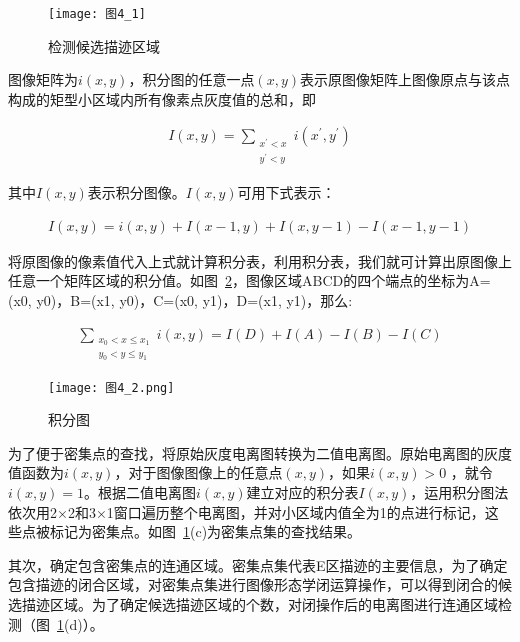 \begin{figure}[!ht]
\centering
\texttt{[image: 图4\_1]}
\caption{检测候选描迹区域}
\label{图4_1}
\end{figure} 

图像矩阵为$i(x,y)$，积分图的任意一点$(x,y)$表示原图像矩阵上图像原点与该点构成的矩型小区域内所有像素点灰度值的总和，即
\begin{linenomath}
\begin{align}
I(x,y)=\sum_{\substack{x^{'}<x\\y^{'}<y}}i(x^{'},y^{'})
\label{式4_1}
\end{align}
\end{linenomath}

其中$I(x,y)$表示积分图像。$I(x,y)$可用下式表示：
\begin{linenomath}
\begin{align}
I(x,y)=i(x,y)+I(x-1,y)+I(x,y-1)-I(x-1,y-1)
\label{式4_2}
\end{align}
\end{linenomath}

          
将原图像的像素值代入上式就计算积分表，利用积分表，我们就可计算出原图像上任意一个矩阵区域的积分值。如图~\ref{图4_2}，图像区域ABCD的四个端点的坐标为A=(x0, y0)，B=(x1, y0)，C=(x0, y1)，D=(x1, y1)，那么:
\begin{linenomath}
\begin{align}
\sum_{\substack{x_{0}<x\le x_{1} \\y_{0}<y\le y_{1}}}i(x,y)=I(D)+I(A)-I(B)-I(C)
\label{式4_3}
\end{align}
\end{linenomath}

\begin{figure}[!ht]
\centering
\texttt{[image: 图4\_2.png]}
\caption{积分图}
\label{图4_2}
\end{figure} 
	        
  
为了便于密集点的查找，将原始灰度电离图转换为二值电离图。原始电离图的灰度值函数为$i(x,y)$，对于图像图像上的任意点$(x,y)$，如果$i(x,y)>0$ ，就令$i(x,y)=1$。根据二值电离图$i(x,y)$建立对应的积分表$I(x,y)$，运用积分图法依次用2×2和3×1窗口遍历整个电离图，并对小区域内值全为1的点进行标记，这些点被标记为密集点。如图~\ref{图4_1}(c)为密集点集的查找结果。
              
其次，确定包含密集点的连通区域。密集点集代表E区描迹的主要信息，为了确定包含描迹的闭合区域，对密集点集进行图像形态学闭运算操作，可以得到闭合的候选描迹区域。为了确定候选描迹区域的个数，对闭操作后的电离图进行连通区域检测（图~\ref{图4_1}(d)）。


